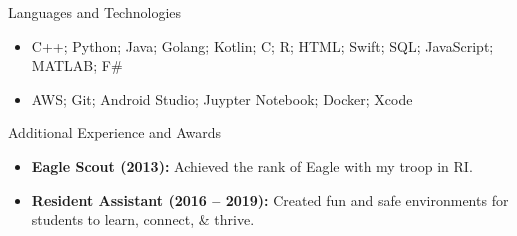 \documentclass[]{mcdowellcv}
\begin{document}
	\begin{cvsection}{Languages and Technologies}
		\begin{cvsubsection}{}{}{}	
			\begin{itemize}
				\item C++; Python; Java; Golang; Kotlin; C; R; HTML; Swift; SQL; JavaScript; MATLAB; F\#
				\item AWS; Git; Android Studio; Juypter Notebook; Docker; Xcode
			\end{itemize}
		\end{cvsubsection}
	\end{cvsection}

	\begin{cvsection}{Additional Experience and Awards}
		\begin{cvsubsection}{}{}{}	
			\begin{itemize}
				\item \textbf{Eagle Scout (2013):} Achieved the rank of Eagle with my troop in RI.
				\item \textbf{Resident Assistant (2016 -- 2019):} Created fun and safe environments for students to learn, connect, \& thrive.
			\end{itemize}
		\end{cvsubsection}
	\end{cvsection}
		
\end{document}
